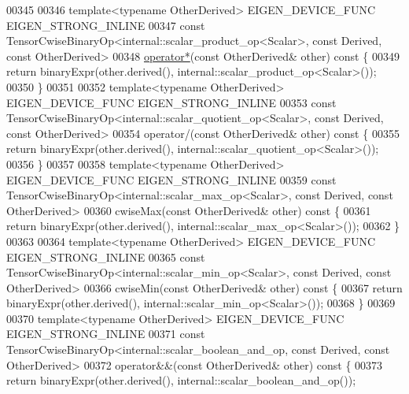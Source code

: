 \begin{DoxyCode}
00345 
00346     \textcolor{keyword}{template}<\textcolor{keyword}{typename} OtherDerived> EIGEN\_DEVICE\_FUNC EIGEN\_STRONG\_INLINE
00347     \textcolor{keyword}{const} TensorCwiseBinaryOp<internal::scalar\_product\_op<Scalar>, \textcolor{keyword}{const} Derived, \textcolor{keyword}{const} OtherDerived>
00348     \hyperlink{namespace_eigen_a32970f7eb62fe31eeefee72d24a046d0}{operator*}(\textcolor{keyword}{const} OtherDerived& other)\textcolor{keyword}{ const }\{
00349       \textcolor{keywordflow}{return} binaryExpr(other.derived(), internal::scalar\_product\_op<Scalar>());
00350     \}
00351 
00352     \textcolor{keyword}{template}<\textcolor{keyword}{typename} OtherDerived> EIGEN\_DEVICE\_FUNC EIGEN\_STRONG\_INLINE
00353     \textcolor{keyword}{const} TensorCwiseBinaryOp<internal::scalar\_quotient\_op<Scalar>, \textcolor{keyword}{const} Derived, \textcolor{keyword}{const} OtherDerived>
00354     operator/(\textcolor{keyword}{const} OtherDerived& other)\textcolor{keyword}{ const }\{
00355       \textcolor{keywordflow}{return} binaryExpr(other.derived(), internal::scalar\_quotient\_op<Scalar>());
00356     \}
00357 
00358     \textcolor{keyword}{template}<\textcolor{keyword}{typename} OtherDerived> EIGEN\_DEVICE\_FUNC EIGEN\_STRONG\_INLINE
00359     \textcolor{keyword}{const} TensorCwiseBinaryOp<internal::scalar\_max\_op<Scalar>, \textcolor{keyword}{const} Derived, \textcolor{keyword}{const} OtherDerived>
00360     cwiseMax(\textcolor{keyword}{const} OtherDerived& other)\textcolor{keyword}{ const }\{
00361       \textcolor{keywordflow}{return} binaryExpr(other.derived(), internal::scalar\_max\_op<Scalar>());
00362     \}
00363 
00364     \textcolor{keyword}{template}<\textcolor{keyword}{typename} OtherDerived> EIGEN\_DEVICE\_FUNC EIGEN\_STRONG\_INLINE
00365     \textcolor{keyword}{const} TensorCwiseBinaryOp<internal::scalar\_min\_op<Scalar>, \textcolor{keyword}{const} Derived, \textcolor{keyword}{const} OtherDerived>
00366     cwiseMin(\textcolor{keyword}{const} OtherDerived& other)\textcolor{keyword}{ const }\{
00367       \textcolor{keywordflow}{return} binaryExpr(other.derived(), internal::scalar\_min\_op<Scalar>());
00368     \}
00369 
00370     \textcolor{keyword}{template}<\textcolor{keyword}{typename} OtherDerived> EIGEN\_DEVICE\_FUNC EIGEN\_STRONG\_INLINE
00371     \textcolor{keyword}{const} TensorCwiseBinaryOp<internal::scalar\_boolean\_and\_op, const Derived, const OtherDerived>
00372     operator&&(\textcolor{keyword}{const} OtherDerived& other)\textcolor{keyword}{ const }\{
00373       \textcolor{keywordflow}{return} binaryExpr(other.derived(), internal::scalar\_boolean\_and\_op());

\end{DoxyCode}
